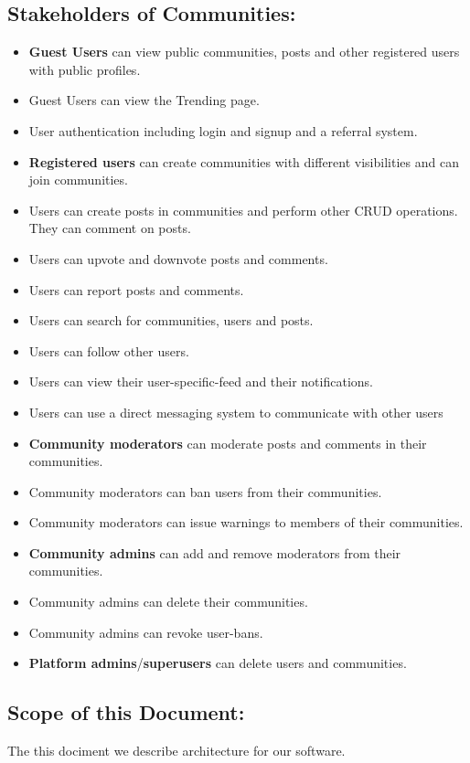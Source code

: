 \documentclass[11pt]{article}
\begin{document}
\subsection{Stakeholders of Communities:}
\begin{itemize}
    \item \textbf{Guest Users} can view public communities, posts and other registered users with public profiles.
    \item Guest Users can view the Trending page.
    \item User authentication including login and signup and a referral system.
    \item \textbf{Registered users} can create communities with different visibilities and can join communities.
    \item Users can create posts in communities and perform other CRUD operations. They can comment on posts.
    \item Users can upvote and downvote posts and comments.
    \item Users can report posts and comments.
    \item Users can search for communities, users and posts.
    \item Users can follow other users.
    \item Users can view their user-specific-feed and their notifications.
    \item Users can use a direct messaging system to communicate with other users
    \item \textbf{Community moderators} can moderate posts and comments in their communities.
    \item Community moderators can ban users from their communities.
    \item Community moderators can issue warnings to members of their communities.
    \item \textbf{Community admins} can add and remove moderators from their communities.
    \item Community admins can delete their communities.
    \item Community admins can revoke user-bans.
    \item \textbf{Platform admins}/\textbf{superusers} can delete users and communities.
\end{itemize}
\subsection{Scope of this Document:}
The this dociment we describe architecture for our software.
\end{document}
